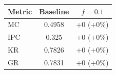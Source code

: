 \begin{tabular}{lcc}
\toprule
Metric & Baseline & $f=0.1$ \\
\midrule
MC & 0.4958 & +0 (+0\%) \\
IPC & 0.325 & +0 (+0\%) \\
KR & 0.7826 & +0 (+0\%) \\
GR & 0.7831 & +0 (+0\%) \\
\bottomrule
\end{tabular}
